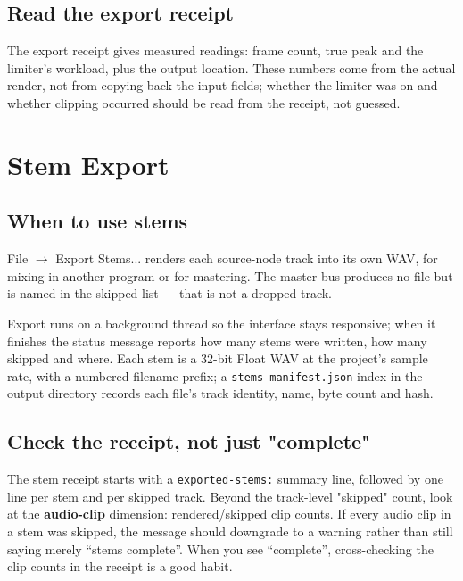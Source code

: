\subsection{Read the export receipt}

The export receipt gives measured readings: frame count, true peak and the limiter's
workload, plus the output location. These numbers come from the actual render, not
from copying back the input fields; whether the limiter was on and whether clipping
occurred should be read from the receipt, not guessed.

\section{Stem Export}

\subsection{When to use stems}

File $\to$ Export Stems... renders each source-node track into its own WAV, for mixing
in another program or for mastering. The master bus produces no file but is named in
the skipped list — that is not a dropped track.

Export runs on a background thread so the interface stays responsive; when it finishes
the status message reports how many stems were written, how many skipped and where.
Each stem is a 32-bit Float WAV at the project's sample rate, with a numbered filename
prefix; a \texttt{stems-manifest.json} index in the output directory records each
file's track identity, name, byte count and hash.


\subsection{Check the receipt, not just "complete"}

The stem receipt starts with a \texttt{exported-stems:} summary line, followed by one
line per stem and per skipped track. Beyond the track-level "skipped" count, look at
the \textbf{audio-clip} dimension: rendered/skipped clip counts. If every audio clip in
a stem was skipped, the message should downgrade to a warning rather than still saying
merely ``stems complete''. When you see ``complete'', cross-checking the clip counts
in the receipt is a good habit.

